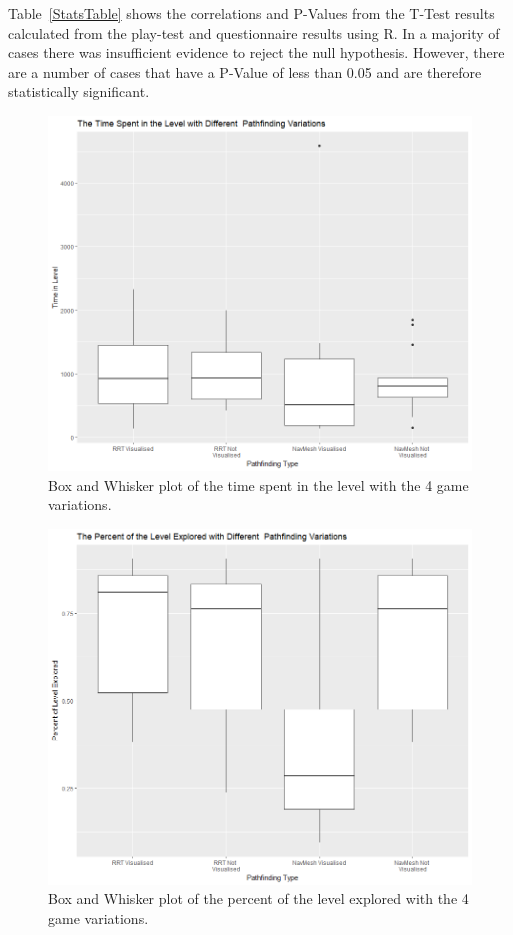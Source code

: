 \documentclass[journal]{IEEEtran}
\begin{document}
	
	Table~\ref{StatsTable} shows the correlations and P-Values from the T-Test results calculated from the play-test and questionnaire results using R. In a majority of cases there was insufficient evidence to reject the null hypothesis. However, there are a number of cases that have a P-Value of less than 0.05 and are therefore statistically significant. 
	
	\begin{figure}[h]
		\includegraphics[width=1.0\linewidth]{GraphTime.png}
		\caption{Box and Whisker plot of the time spent in the level with the 4 game variations.}
		\label{graph:Time}
	\end{figure}  
	
	\begin{figure}[h]
		\includegraphics[width=1.0\linewidth]{GraphPercent.png}
		\caption{Box and Whisker plot of the percent of the level explored with the 4 game variations.}
		\label{graph:Percent}
	\end{figure}
\end{document}
